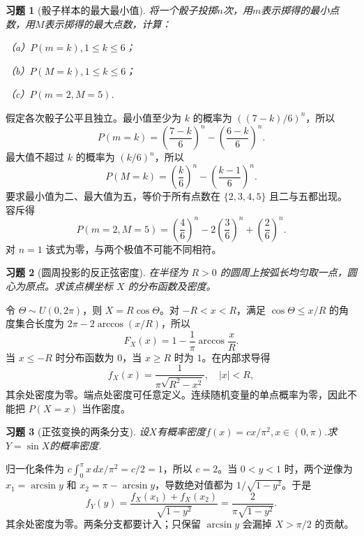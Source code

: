 \documentclass[UTF8,12pt,a4paper,fontset=fandol]{ctexart}
\newtheorem{exercise}{习题}[section]
\begin{document}
\begin{exercise}[骰子样本的最大最小值]\label{q:Y3.25}
将一个骰子投掷$n$次，用$m$表示掷得的最小点数，用$M$表示掷得的最大点数，计算：

（a）$P(m=k),1\leqslant k\leqslant 6$；

（b）$P(M=k),1\leqslant k\leqslant 6$；

（c）$P(m=2,M=5)$.\par{}
\end{exercise}

\begin{solve}\label{a:Y3.25}假定各次骰子公平且独立。最小值至少为 $k$ 的概率为 $((7-k)/6)^n$，所以\[P(m=k)=\left(\frac{7-k}{6}\right)^n-\left(\frac{6-k}{6}\right)^n.\]最大值不超过 $k$ 的概率为 $(k/6)^n$，所以\[P(M=k)=\left(\frac{k}{6}\right)^n-\left(\frac{k-1}{6}\right)^n.\]要求最小值为二、最大值为五，等价于所有点数在 $\{2,3,4,5\}$ 且二与五都出现。容斥得\[P(m=2,M=5)=\left(\frac46\right)^n-2\left(\frac36\right)^n+\left(\frac26\right)^n.\]对 $n=1$ 该式为零，与两个极值不可能不同相符。\end{solve}

\begin{exercise}[圆周投影的反正弦密度]\label{q:Y3.26}
在半径为 $R>0$ 的圆周上按弧长均匀取一点，圆心为原点。求该点横坐标 $X$ 的分布函数及密度。\par{}
\end{exercise}

\begin{solve}\label{a:Y3.26}令 $\Theta\sim U(0,2\pi)$，则 $X=R\cos\Theta$。对 $-R<x<R$，满足 $\cos\Theta\le x/R$ 的角度集合长度为 $2\pi-2\arccos(x/R)$，所以\[F_X(x)=1-\frac{1}{\pi}\arccos\frac{x}{R}.\]当 $x\le-R$ 时分布函数为 $0$，当 $x\ge R$ 时为 $1$。在内部求导得\[f_X(x)=\frac{1}{\pi\sqrt{R^2-x^2}},\quad |x|<R,\]其余处密度为零。端点处密度可任意定义。连续随机变量的单点概率为零，因此不能把 $P(X=x)$ 当作密度。\end{solve}

\begin{exercise}[正弦变换的两条分支]\label{q:Y3.28}
设$X$有概率密度$f(x)=cx/\pi^2,x\in (0,\pi)$.求$Y=\sin X$的概率密度.\par{}
\end{exercise}

\begin{solve}\label{a:Y3.28}归一化条件为 $c\int_0^\pi x\,dx/\pi^2=c/2=1$，所以 $c=2$。当 $0<y<1$ 时，两个逆像为 $x_1=\arcsin y$ 和 $x_2=\pi-\arcsin y$，导数绝对值都为 $1/\sqrt{1-y^2}$。于是\[f_Y(y)=\frac{f_X(x_1)+f_X(x_2)}{\sqrt{1-y^2}}=\frac{2}{\pi\sqrt{1-y^2}}.\]其余处密度为零。两条分支都要计入；只保留 $\arcsin y$ 会漏掉 $X>\pi/2$ 的贡献。\end{solve}
\end{document}
